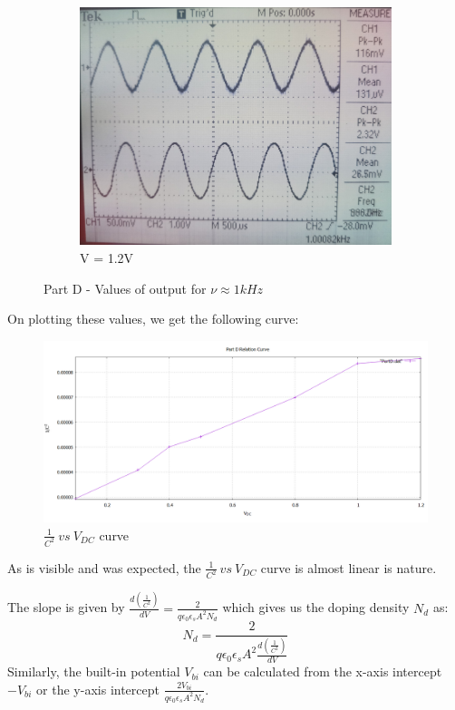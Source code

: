 \documentclass[12pt]{article}
\begin{document}
\begin{figure}[H]
\begin{subfigure}[b]{0.45\linewidth}
		\includegraphics[width = \linewidth, trim = {0 0 0 0}, clip]{PartD_7.jpg}
		\caption{V = 1.2V}
	\end{subfigure}
	\caption{Part D - Values of output for \( \nu \approx 1kHz\)}
\end{figure}
On plotting these values, we get the following curve:
\begin{figure}[H]
	\centering
	\includegraphics[scale=0.5]{RelationCurve.png}
	\caption{\( \frac{1}{C^2}\ vs\ V_{DC} \) curve}
\end{figure}

As is visible and was expected, the \( \frac{1}{C^2}\ vs\ V_{DC} \) curve is almost linear is nature.

The slope is given by \( \frac{d(\frac{1}{C^2})}{dV} = \frac{2}{q\epsilon_0\epsilon_sA^2N_d} \) which gives us the doping density \( N_d \) as:
\[ N_d = \frac{2}{q\epsilon_0\epsilon_sA^2\frac{d(\frac{1}{C^2})}{dV}} \]
Similarly, the built-in potential \( V_{bi} \) can be calculated from the x-axis intercept \( -V_{bi} \) or the y-axis intercept  \( \frac{2V_{bi}}{q\epsilon_0\epsilon_sA^2N_d} \). \\
\end{document}
